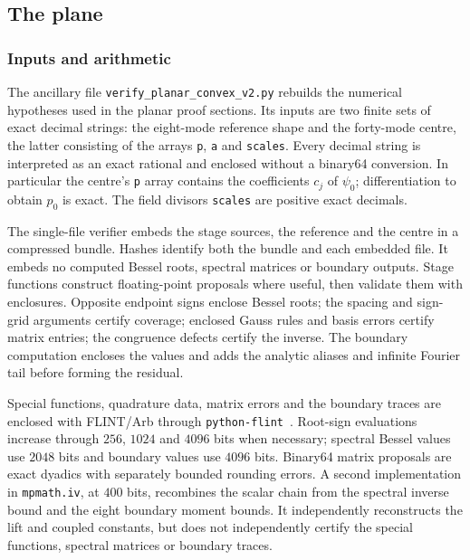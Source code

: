 \subsection{The plane}\label{r2:sec:computer}

\subsubsection{Inputs and arithmetic}
The ancillary file \texttt{verify\_planar\_convex\_v2.py} rebuilds the numerical hypotheses used in the planar proof sections. Its inputs are two finite sets of exact decimal strings: the eight-mode reference shape and the forty-mode centre, the latter consisting of the arrays \texttt{p}, \texttt{a} and \texttt{scales}. Every decimal string is interpreted as an exact rational and enclosed without a binary64 conversion. In particular the centre's \texttt{p} array contains the coefficients $c_j$ of $\psi_0$; differentiation to obtain $p_0$ is exact. The field divisors \texttt{scales} are positive exact decimals.

The single-file verifier embeds the stage sources, the reference and the centre in a compressed bundle. Hashes identify both the bundle and each embedded file. It embeds no computed Bessel roots, spectral matrices or boundary outputs. Stage functions construct floating-point proposals where useful, then validate them with enclosures. Opposite endpoint signs enclose Bessel roots; the spacing and sign-grid arguments certify coverage; enclosed Gauss rules and basis errors certify matrix entries; the congruence defects certify the inverse. The boundary computation encloses the values and adds the analytic aliases and infinite Fourier tail before forming the residual.

Special functions, quadrature data, matrix errors and the boundary traces are enclosed with FLINT/Arb through \texttt{python-flint}~\cite{flint,Joh17}. Root-sign evaluations increase through $256$, $1024$ and $4096$ bits when necessary; spectral Bessel values use $2048$ bits and boundary values use $4096$ bits. Binary64 matrix proposals are exact dyadics with separately bounded rounding errors. A second implementation in \texttt{mpmath.iv}, at $400$ bits, recombines the scalar chain from the spectral inverse bound and the eight boundary moment bounds. It independently reconstructs the lift and coupled constants, but does not independently certify the special functions, spectral matrices or boundary traces.

